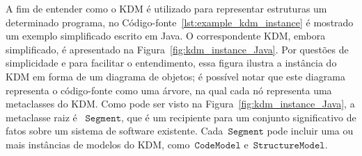A fim de entender como o KDM é utilizado para representar estruturas um determinado programa, no Código-fonte~\ref{lst:example_kdm_instance} é mostrado um exemplo simplificado escrito em Java. O correspondente KDM, embora simplificado, é apresentado na Figura~\ref{fig:kdm_instance_Java}. Por questões de simplicidade e para facilitar o entendimento, essa figura ilustra a instância do KDM em forma de um diagrama de objetos; é possível notar que este diagrama representa o código-fonte como uma árvore, na qual cada nó representa uma metaclasses do KDM. Como pode ser visto na Figura~\ref{fig:kdm_instance_Java}, a metaclasse raiz é ~$\mathtt{Segment}$, que é um recipiente para um conjunto significativo de fatos sobre um sistema de software existente. Cada~$\mathtt{Segment}$ pode incluir uma ou mais instâncias de modelos do KDM, como~$\mathtt{CodeModel}$ e~$\mathtt{StructureModel}$.


